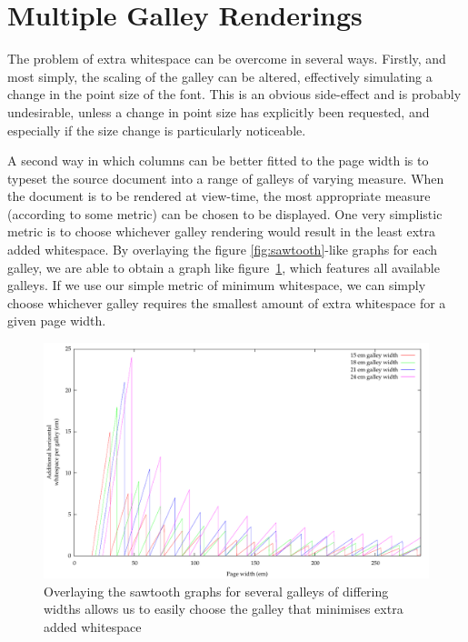 \section{Multiple Galley Renderings}
\label{sec:multigalleymetric}
The problem of extra whitespace can be overcome in several ways. Firstly, and most simply, the scaling of the galley can be altered, effectively simulating a change in the point size of the font. This is an obvious side-effect and is probably undesirable, unless a change in point size has explicitly been requested, and especially if the size change is particularly noticeable.

A second way in which columns can be better fitted to the page width is to typeset the source document into a range of galleys of varying \gls{measure}. When the document is to be rendered at view-time, the most appropriate \gls{measure} (according to some metric) can be chosen to be displayed. One very simplistic metric is to choose whichever galley rendering would result in the least extra added whitespace. By overlaying the figure \mbox{\ref{fig:sawtooth}-like} graphs for each galley, we are able to obtain a graph like figure~\ref{fig:overlay}, which features all available galleys. If we use our simple metric of minimum whitespace, we can simply choose whichever galley requires the smallest amount of extra whitespace for a given page width.

\begin{figure}
 \includegraphics[height=\textwidth,angle=90]{gnuplot/overlay}
 \caption[Extra whitespace in a multi-galley document]{Overlaying the sawtooth graphs for several galleys of differing widths allows us to easily choose the galley that minimises extra added whitespace}
 \label{fig:overlay}
\end{figure}


